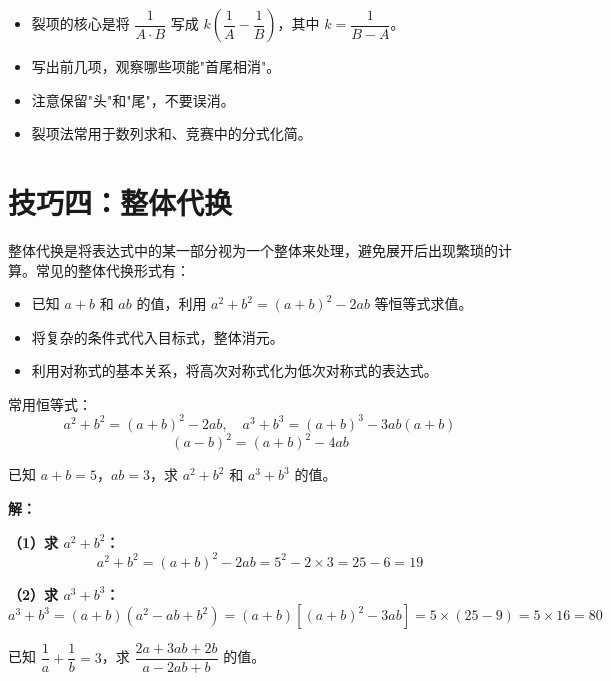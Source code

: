 \documentclass[12pt, a4paper]{ctexart}
\begin{document}
\begin{tipbox}[裂项法要点总结]
\begin{itemize}[leftmargin=1.5em]
  \item 裂项的核心是将 $\dfrac{1}{A \cdot B}$ 写成 $k\!\left(\dfrac{1}{A} - \dfrac{1}{B}\right)$，其中 $k = \dfrac{1}{B-A}$。
  \item 写出前几项，观察哪些项能"首尾相消"。
  \item 注意保留"头"和"尾"，不要误消。
  \item 裂项法常用于数列求和、竞赛中的分式化简。
\end{itemize}
\end{tipbox}

\section*{\textcolor{mainblue}{技巧四：整体代换}}

\begin{knowledgebox}[整体代换的核心思想]
整体代换是将表达式中的某一部分视为一个整体来处理，避免展开后出现繁琐的计算。常见的整体代换形式有：
\begin{itemize}[leftmargin=1.5em]
  \item 已知 $a+b$ 和 $ab$ 的值，利用 $a^2+b^2 = (a+b)^2 - 2ab$ 等恒等式求值。
  \item 将复杂的条件式代入目标式，整体消元。
  \item 利用对称式的基本关系，将高次对称式化为低次对称式的表达式。
\end{itemize}
常用恒等式：
\[
a^2+b^2 = (a+b)^2 - 2ab, \quad a^3+b^3 = (a+b)^3 - 3ab(a+b)
\]
\[
(a-b)^2 = (a+b)^2 - 4ab
\]
\end{knowledgebox}

\begin{examplebox}
已知 $a+b=5$，$ab=3$，求 $a^2+b^2$ 和 $a^3+b^3$ 的值。
\end{examplebox}

\textbf{解：}

\textbf{（1）求 $a^2+b^2$：}
\[
a^2+b^2 = (a+b)^2 - 2ab = 5^2 - 2\times 3 = 25 - 6 = \boxed{19}
\]

\textbf{（2）求 $a^3+b^3$：}
\[
a^3+b^3 = (a+b)(a^2-ab+b^2) = (a+b)\left[(a+b)^2 - 3ab\right] = 5 \times (25-9) = 5\times 16 = \boxed{80}
\]

\begin{examplebox}[【例9】整体代换求分式值]
已知 $\dfrac{1}{a} + \dfrac{1}{b} = 3$，求 $\dfrac{2a+3ab+2b}{a-2ab+b}$ 的值。
\end{examplebox}
\end{document}
